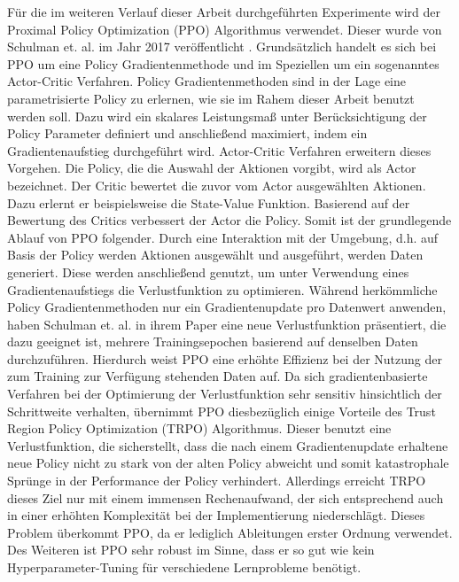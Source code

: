 Für die im weiteren Verlauf dieser Arbeit durchgeführten Experimente wird der Proximal Policy Optimization (PPO) Algorithmus verwendet. Dieser wurde von Schulman et. al. im Jahr 2017 veröffentlicht \cite{PPO}. Grundsätzlich handelt es sich bei PPO um eine Policy Gradientenmethode und im Speziellen um ein sogenanntes Actor-Critic Verfahren. Policy Gradientenmethoden sind in der Lage eine parametrisierte Policy zu erlernen, wie sie im Rahem dieser Arbeit benutzt werden soll. Dazu wird ein skalares Leistungsmaß unter Berücksichtigung der Policy Parameter definiert und anschließend maximiert, indem ein Gradientenaufstieg durchgeführt wird. Actor-Critic Verfahren erweitern dieses Vorgehen. Die Policy, die die Auswahl der Aktionen vorgibt, wird als Actor bezeichnet. Der Critic bewertet die zuvor vom Actor ausgewählten Aktionen. Dazu erlernt er beispielsweise die State-Value Funktion. Basierend auf der Bewertung des Critics verbessert der Actor die Policy. Somit ist der grundlegende Ablauf von PPO folgender. Durch eine Interaktion mit der Umgebung, d.h. auf Basis der Policy werden Aktionen ausgewählt und ausgeführt, werden Daten generiert. Diese werden anschließend genutzt, um unter Verwendung eines Gradientenaufstiegs die Verlustfunktion zu optimieren. Während herkömmliche Policy Gradientenmethoden nur ein Gradientenupdate pro Datenwert anwenden, haben Schulman et. al. in ihrem Paper eine neue Verlustfunktion präsentiert, die dazu geeignet ist, mehrere Trainingsepochen basierend auf denselben Daten durchzuführen. Hierdurch weist PPO eine erhöhte Effizienz bei der Nutzung der zum Training zur Verfügung stehenden Daten auf. Da sich gradientenbasierte Verfahren bei der Optimierung der Verlustfunktion sehr sensitiv hinsichtlich der Schrittweite verhalten, übernimmt PPO diesbezüglich einige Vorteile des Trust Region Policy Optimization (TRPO) Algorithmus. Dieser benutzt eine Verlustfunktion, die sicherstellt, dass die nach einem Gradientenupdate erhaltene neue Policy nicht zu stark von der alten Policy abweicht und somit katastrophale Sprünge in der Performance der Policy verhindert. Allerdings erreicht TRPO dieses Ziel nur mit einem immensen Rechenaufwand, der sich entsprechend auch in einer erhöhten Komplexität bei der Implementierung niederschlägt. Dieses Problem überkommt PPO, da er lediglich Ableitungen erster Ordnung verwendet. Des Weiteren ist PPO sehr robust im Sinne, dass er so gut wie kein Hyperparameter-Tuning für verschiedene Lernprobleme benötigt. \\

